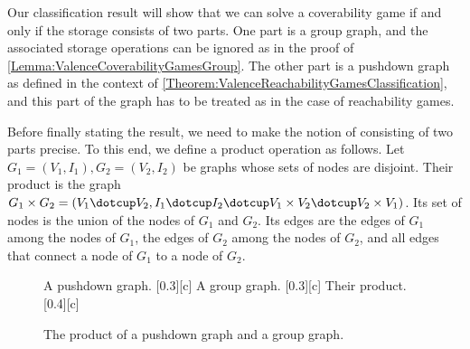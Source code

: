 \documentclass[../../diss.tex]{subfiles}
\begin{document}
Our classification result will show that we can solve a coverability game if and only if the storage consists of two parts.
One part is a group graph, and the associated storage operations can be ignored as in the proof of \cref{Lemma:ValenceCoverabilityGamesGroup}.
The other part is a pushdown graph as defined in the context of \cref{Theorem:ValenceReachabilityGamesClassification}, and this part of the graph has to be treated as in the case of reachability games.

Before finally stating the result, we need to make the notion of consisting of two parts precise.
To this end, we define a product operation as follows.
Let $G_1 = (V_1,I_1), G_2 = (V_2, I_2)$ be graphs whose sets of nodes are disjoint.
Their product is the graph $G_1 \times G_2 = (V_1 \dotcup V_2, I_1 \dotcup I_2 \dotcup V_1 \times V_2 \dotcup V_2 \times V_1)$.
Its set of nodes is the union of the nodes of $G_1$ and $G_2$.
Its edges are the edges of $G_1$ among the nodes of $G_1$, the edges of $G_2$ among the nodes of $G_2$, and all edges that connect a node of $G_1$ to a node of $G_2$.

\begin{figure}[t]
    {%
        \centering%
        \subcaptionbox%
        {%
            A pushdown graph.%
            \label{Figure:ValenceGraphProductsPushdown}%
        }[0.3\textwidth][c]%
        {%
        }%
    }%
    {%
        \centering%
        \subcaptionbox%
        {%
            A group graph.%
            \label{Figure:ValenceGraphProductsGroup}%
        }[0.3\textwidth][c]%
        {%
        }%
    }%
    {%
        \centering%
        \subcaptionbox%
        {%
            Their product.%
            \label{Figure:ValenceGraphProductsProduct}%
        }[0.4\textwidth][c]%
        {%
        }%
    }%
    \caption{The product of a pushdown graph and a group graph.}%
    \label{Figure:ValenceGraphProducts}%
\end{figure}
\end{document}
